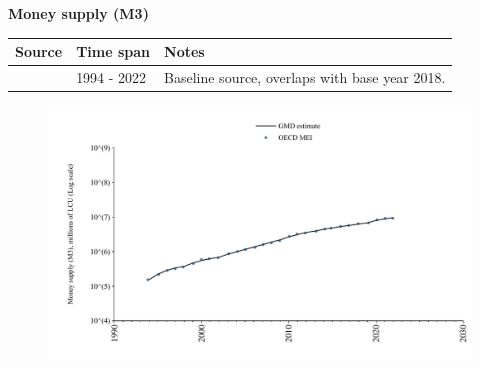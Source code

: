 \documentclass[12pt,a4paper,landscape]{article}
\begin{document}
\begin{adjustbox}{max totalsize={\paperwidth}{\paperheight},center}
\begin{minipage}[t][\textheight][t]{\textwidth}
\vspace*{0.5cm}
{}
\begin{center}
{\Large\bfseries Money supply (M3)}
\end{center}
\vspace{0.5cm}
\begin{table}[H]
\centering
\small
\begin{tabular}{|l|l|l|}
\hline
\textbf{Source} & \textbf{Time span} & \textbf{Notes} \\
\hline
\rowcolor{white}\cite{OECD_MEI}& 1994 - 2022 &Baseline source, overlaps with base year 2018. \\
\hline
\end{tabular}
\end{table}
\begin{figure}[H]
\centering
\includegraphics[width=\textwidth,height=0.6\textheight,keepaspectratio]{graphs/BRA_M3.pdf}
\end{figure}
\end{minipage}
\end{adjustbox}
\end{document}
